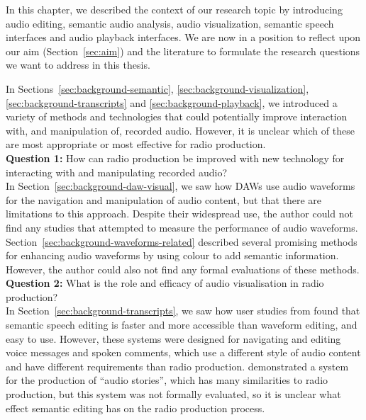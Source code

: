 In this chapter, we described the context of our research topic by introducing audio editing, semantic audio analysis,
audio visualization, semantic speech interfaces and audio playback interfaces.  We are now in a position to reflect
upon our aim (Section~\ref{sec:aim}) and the literature to formulate the research questions we want to address in this
thesis.

In Sections~\ref{sec:background-semantic}, \ref{sec:background-visualization}, \ref{sec:background-transcripts} and
\ref{sec:background-playback}, we introduced a variety of methods and technologies that could potentially improve
interaction with, and manipulation of, recorded audio. However, it is unclear which of these are most appropriate or
most effective for radio production.
\\

\noindent
\hangindent=15pt
\textbf{Question 1:} How can radio production be improved with new technology for interacting with and manipulating
recorded audio?
\\

In Section~\ref{sec:background-daw-visual}, we saw how DAWs use audio waveforms for the navigation and manipulation of
audio content, but that there are limitations to this approach.  Despite their widespread use, the author
could not find any studies that attempted to measure the performance of audio waveforms.
Section~\ref{sec:background-waveforms-related} described several promising methods for enhancing audio waveforms by
using colour to add semantic information. However, the author could also not find any formal evaluations of these
methods.
\\

\noindent
\hangindent=15pt
\textbf{Question 2:} What is the role and efficacy of audio visualisation in radio production?
\\

In Section~\ref{sec:background-transcripts}, we saw how user studies from \citet{Whittaker2004,Yoon2014,Sivaraman2016}
found that semantic speech editing is faster and more accessible than waveform editing, and easy to use.  However,
these systems were designed for navigating and editing voice messages and spoken comments, which use a different style
of audio content and have different requirements than radio production.  \citet{Rubin2013} demonstrated a system for
the production of ``audio stories'', which has many similarities to radio production, but this system was not formally
evaluated, so it is unclear what effect semantic editing has on the radio production process.
\\

